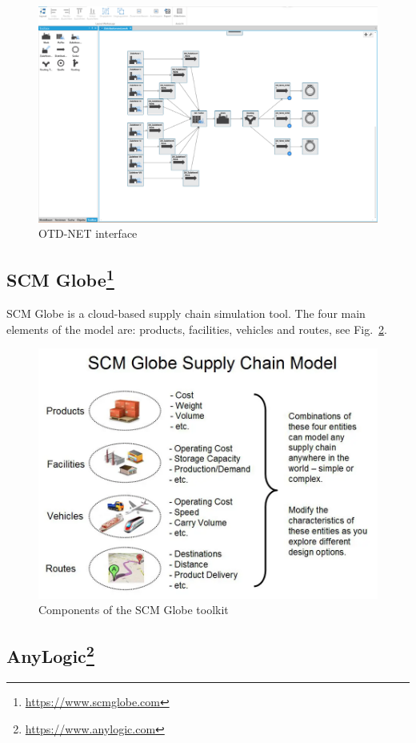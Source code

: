 \documentclass{article}
\begin{document}
\begin{figure}[ht!]
	\center
	\includegraphics[width=.7\textwidth]{otdnet.png} 
	\caption{OTD-NET interface}\label{fig:otdnet}
\end{figure}


\subsection[SCM Globe]{SCM Globe\protect\footnote{\href{https://www.scmglobe.com}{https://www.scmglobe.com}}}

SCM Globe is a cloud-based supply chain simulation tool. The four main elements of the model are: products, facilities, vehicles and routes, see Fig.~\ref{fig:scmglobe}.

\begin{figure}[ht!]
	\center
	\includegraphics[width=.7\textwidth]{scmglobe.png} 
	\caption{Components of the SCM Globe toolkit}\label{fig:scmglobe}
\end{figure}


\subsection[AnyLogic]{AnyLogic\protect\footnote{\href{https://www.anylogic.com}{https://www.anylogic.com}}}
\end{document}
